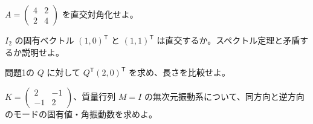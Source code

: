 \documentclass[11pt]{article}
\begin{document}

\problem[直交対角化]
$A=\begin{pmatrix}4&2\\2&4\end{pmatrix}$ を直交対角化せよ。
\workspace{38mm}

\problem[重複固有値]
$I_2$ の固有ベクトル $(1,0)^{\mathsf T}$ と $(1,1)^{\mathsf T}$ は直交するか。スペクトル定理と矛盾するか説明せよ。
\workspace{38mm}
\newpage

\problem[長さの保存]
問題1の $Q$ に対して $Q^{\mathsf T}(2,0)^{\mathsf T}$ を求め、長さを比較せよ。
\workspace{38mm}

\problem[剛性のモード]
$K=\begin{pmatrix}2&-1\\-1&2\end{pmatrix}$、質量行列 $M=I$ の無次元振動系について、同方向と逆方向のモードの固有値・角振動数を求めよ。
\workspace{38mm}
\end{document}
